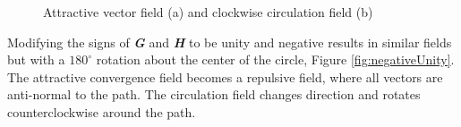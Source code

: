 \documentclass[numbered,pdftex]{ohio-etd}
\begin{document}
\begin{figure}[]
	\begin{subfigmatrix}{2}%
		\centering	
		\hspace*{0mm}
	\end{subfigmatrix}
	\caption{Attractive vector field (a) and clockwise circulation field (b)}
	\label{fig:positiveUnity}
\end{figure}

Modifying the signs of \textit{\textbf{G}} and \textit{\textbf{H}} to be unity and negative results in similar fields but with a $180^{\circ}$ rotation about the center of the circle, Figure \ref{fig:negativeUnity}. The attractive convergence field becomes a repulsive field, where all vectors are anti-normal to the path. The circulation field changes direction and rotates counterclockwise around the path. 
\end{document}
